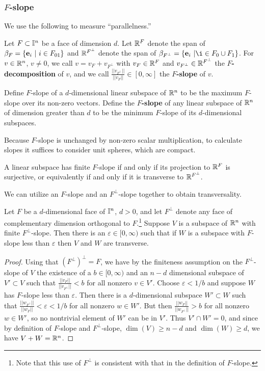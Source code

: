 \subsubsection{$F$-slope}

We use the following to measure ``parallelness.''

\begin{definition}
	Let $F \subset \mathbb{I}^n$ be a face of dimension $d$.
	Let $\mathbb{R}^F$ denote the span of
	$\beta_F = \{\mathbf{e}_i\ |\ i \in F_{01}\}$ and $\mathbb{R}^{F^\perp}$ denote the span of $\beta_{F^\perp} = \{\e_i\ |\i \in F_0 \cup F_1\}$.
	For $v \in \mathbb{R}^n$, $v \neq 0$, we call $v = v_F + v_{F^\perp}$ with $v_F \in \mathbb{R}^F$ and $v_{F^\perp} \in \mathbb{R}^{F^\perp}$ the {\bf $F$-decomposition} of $v$, and we call $\frac{|| v_{F^\perp}||}{||v_{F}||} \in [0,\infty]$ the {\bf $F$-slope} of $v$.

	Define $F$-slope of a $d$-dimensional linear subspace of $\mathbb{R}^n$ to be the maximum $F$-slope over its non-zero vectors.
	Define the {\bf $F$-slope} of any linear subspace of $\mathbb{R}^n$ of dimension greater than $d$ to be the minimum $F$-slope of its $d$-dimensional subspaces.
\end{definition}

Because $F$-slope is unchanged by non-zero scalar multiplication, to calculate slopes it suffices to consider unit spheres,
which are compact.

A linear subspace has finite $F$-slope if and only if its projection to $\mathbb{R}^F$ is surjective, or equivalently if and only if it is transverse to $\mathbb{R}^{F^\perp}$.

We can utilize an $F$-slope and an $F^\perp$-slope together to obtain transversality.

\begin{lemma}\label{L:complementaryslopes}
	Let $F$ be a $d$-dimensional face of $\mathbb{I}^n$, $d>0$, and let $F^\perp$ denote any face of complementary dimension orthogonal to $F$.\footnote{Note that this use of $F^\perp$ is consistent with that in the definition of $F$-slope.}
	Suppose $V$ is a subspace of $\mathbb{R}^n$ with finite $F^\perp$-slope.
	Then there is an $\varepsilon \in [0,\infty)$ such that if $W$ is a subspace with $F$-slope less than $\varepsilon$ then $V$ and $W$ are transverse.
\end{lemma}

\begin{proof}
	Using that $(F^\perp)^\perp = F$, we have by the finiteness assumption on the $F^\perp$-slope of $V$
	the existence of a $b \in [0,\infty)$ and an $n-d$ dimensional subspace of $V' \subset V$ such that $\frac{||v_{F}||}{||v_{F^\perp}||} <b$ for all nonzero $v \in V'$.
	Choose $\varepsilon < 1/b$ and suppose $W$ has $F$-slope less than $\varepsilon$.
	Then there is a $d$-dimensional subspace $W' \subset W$ such that $\frac{|| w_{F^\perp}||}{||w_{F}||} < \varepsilon < 1/b$ for all nonzero $w \in W'$.
	But then $\frac{|| w_{F}||}{||w_{F^\perp}||} > b$ for all nonzero $w \in W'$, so no nontrivial element of $W'$ can be in $V'$.
	Thus $V' \cap W' = 0$, and since by definition of $F$-slope and $F^\perp$-slope,
	$\dim(V) \geq n-d$ and $\dim(W) \geq d$, we have $V + W = \mathbb{R}^n$.
\end{proof}


